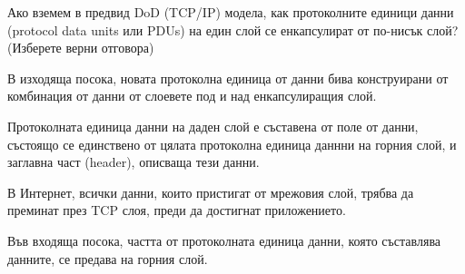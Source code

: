 \question[6] Ако вземем в предвид \foreignlanguage{english}{DoD (TCP/IP)}
модела, как протоколните единици данни (\foreignlanguage{english}{protocol data
  units} или \foreignlanguage{english}{PDUs}) на един слой се енкапсулират от
по-нисък слой? (Изберете верни отговора)

\begin{choices}
  \choice В изходяща посока, новата протоколна единица от данни бива
  конструирани от комбинация от данни от слоевете под и над енкапсулиращия слой.

  \CorrectChoice Протоколната единица данни на даден слой е съставена от поле от
  данни, състоящо се единствено от цялата протоколна единица даннни на горния
  слой, и заглавна част (\foreignlanguage{english}{header}), описваща тези
  данни.

  \choice В Интернет, всички данни, които пристигат от мрежовия слой, трябва да
  преминат през TCP слоя, преди да достигнат приложението.

  \CorrectChoice Във входяща посока, частта от протоколната единица данни, която
  съставлява данните, се предава на горния слой.
\end{choices}